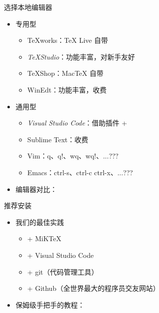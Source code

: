 \begin{frame}{选择本地编辑器}
    \begin{itemize}
      \item<+-> 专用型
    
        \begin{itemize}
          \item TeXworks：\TeX{} Live 自带 \faWindows{} \faApple{} \faLinux{}
          \item \emph{TeXStudio}：功能丰富，对新手友好 \faWindows{} \faApple{} \faLinux{}
          \item TeXShop：Mac\TeX{} 自带 \faApple{}
          \item WinEdt：功能丰富，收费 \faWindows{}
        \end{itemize}
    
      \item<+-> 通用型
    
        \begin{itemize}
          \item \emph{Visual Studio Code}：借助插件  + 
          \item Sublime Text：收费
          \item Vim：q、q!、wq、wq!、...???
          \item Emacs：ctrl-s、ctrl-c ctrl-x、...???
        \end{itemize}
  
      \item<+-> 编辑器对比：
    \end{itemize}
\end{frame}


\begin{frame}{推荐安装}
    \begin{itemize}
      \item<+-> 我们的最佳实践
    
        \begin{itemize}
            \item + MiK\TeX{}
            \item + Visual Studio Code
            \item + git（代码管理工具）
            \item + Github（全世界最大的程序员交友网站）
        \end{itemize}

      \item<+-> 保姆级手把手的教程：

    \end{itemize}
\end{frame}

